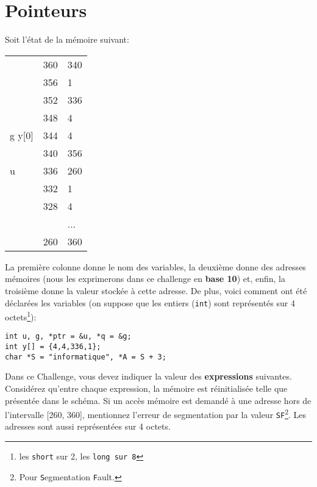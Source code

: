 \documentclass[12pt]{article}
\begin{document}
\lstset{style=CStyle}


\setcounter{section}{0}
\section{Pointeurs}

Soit l'état de la mémoire suivant:

\begin{table}[!htbp]
  \centering
  \begin{tabular}{ll|l|}
\cline{3-3}
 & 360 & 340\\ \cline{3-3}
 & 356 & 1\\ \cline{3-3}
 & 352 & 336\\ \cline{3-3}
 & 348 & 4\\ \cline{3-3}
g y[0] & 344 & 4\\ \cline{3-3}
 & 340 & 356\\ \cline{3-3}
u  & 336 & 260\\ \cline{3-3}
 & 332 & 1\\ \cline{3-3}
 & 328 & 4\\ \cline{3-3}
 &  & ...\\ \cline{3-3}
 & 260 & 360\\ \cline{3-3}

  \end{tabular}
\end{table}

La première colonne donne le nom des variables, la deuxième donne des adresses
mémoires (nous les exprimerons dans ce challenge en \textbf{base 10}) et, enfin,
la troisième donne la valeur stockée à cette adresse. De plus, voici comment ont été déclarées les variables (on suppose que les entiers (\texttt{int}) sont représentés sur 4
octets\footnote{les \texttt{short} sur 2, les \texttt{long sur 8}}):

\begin{lstlisting}
int u, g, *ptr = &u, *q = &g;
int y[] = {4,4,336,1};
char *S = "informatique", *A = S + 3;
\end{lstlisting}

Dans ce Challenge, vous devez indiquer la valeur des \textbf{expressions}
suivantes. Considérez qu'entre chaque expression, la mémoire est réinitialisée
telle que présentée dans le schéma. Si un accès mémoire est demandé à une
adresse hors de l'intervalle [260, 360], mentionnez l'erreur de segmentation par la valeur \texttt{SF}\footnote{Pour \texttt{S}egmentation \texttt{F}ault.}. Les adresses sont aussi représentées sur 4 octets. 
\end{document}
